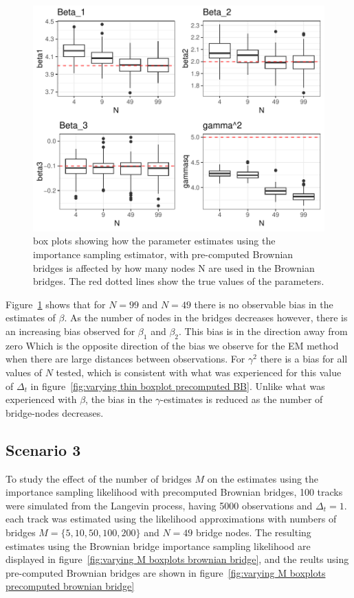 \begin{figure}[H]
    \centering
    \includegraphics[width=\linewidth]{Images/Results/varying N estimates.pdf}
    \caption[Box plots of Parameter Estimates for various Ns]{box plots showing how the parameter estimates using the importance sampling estimator, with pre-computed Brownian bridges is affected by how many nodes N are used in the Brownian bridges. The red dotted lines show the true values of the parameters.}
    \label{fig: varying N boxplots precomputed brownian bridge}
\end{figure}

Figure~\ref{fig: varying N boxplots precomputed brownian bridge} shows that for $N=99$ and $N=49$ there is no observable bias in the estimates of $\beta$. As the number of nodes in the bridges decreases however, there is an increasing bias observed for $\beta_1$ and $\beta_2$. This bias is in the direction away from zero Which is the opposite direction of the bias we observe for the EM method when there are large distances between observations. For $\gamma^2$ there is a bias for all values of $N$ tested, which is consistent with what was experienced for this value of $\Delta_t$ in figure~\ref{fig:varying thin boxplot precomputed BB}. Unlike what was experienced with $\beta$, the bias in the $\gamma$-estimates is reduced as the number of bridge-nodes decreases.

\subsection{Scenario 3}
To study the effect of the number of bridges $M$ on the estimates using the importance sampling likelihood with precomputed Brownian bridges, 100 tracks were simulated from the Langevin process, having 5000 observations and $\Delta_t = 1$. each track was estimated using the likelihood approximations with numbers of bridges $M=\{5,10,50,100,200\}$ and $N=49$ bridge nodes. The resulting estimates using the Brownian bridge importance sampling likelihood are displayed in figure~\ref{fig:varying M boxplots brownian bridge}, and the reults using pre-computed Brownian bridges are shown in figure~\ref{fig:varying M boxplots precomputed brownian bridge}


